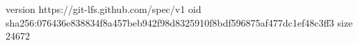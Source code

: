 version https://git-lfs.github.com/spec/v1
oid sha256:076436e838834f8a457beb942f98d8325910f8bdf596875af477dc1ef48c3ff3
size 24672
